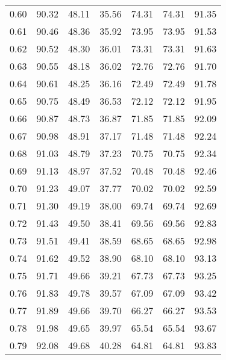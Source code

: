 \begin{tabular}{|c|c|c|c|c|c|c|}
      0.60 &     90.32 &     48.11 &      35.56 &   74.31 &      74.31 &         91.35 \\
      0.61 &     90.46 &     48.36 &      35.92 &   73.95 &      73.95 &         91.53 \\
      0.62 &     90.52 &     48.30 &      36.01 &   73.31 &      73.31 &         91.63 \\
      0.63 &     90.55 &     48.18 &      36.02 &   72.76 &      72.76 &         91.70 \\
      0.64 &     90.61 &     48.25 &      36.16 &   72.49 &      72.49 &         91.78 \\
      0.65 &     90.75 &     48.49 &      36.53 &   72.12 &      72.12 &         91.95 \\
      0.66 &     90.87 &     48.73 &      36.87 &   71.85 &      71.85 &         92.09 \\
      0.67 &     90.98 &     48.91 &      37.17 &   71.48 &      71.48 &         92.24 \\
      0.68 &     91.03 &     48.79 &      37.23 &   70.75 &      70.75 &         92.34 \\
      0.69 &     91.13 &     48.97 &      37.52 &   70.48 &      70.48 &         92.46 \\
      0.70 &     91.23 &     49.07 &      37.77 &   70.02 &      70.02 &         92.59 \\
      0.71 &     91.30 &     49.19 &      38.00 &   69.74 &      69.74 &         92.69 \\
      0.72 &     91.43 &     49.50 &      38.41 &   69.56 &      69.56 &         92.83 \\
      0.73 &     91.51 &     49.41 &      38.59 &   68.65 &      68.65 &         92.98 \\
      0.74 &     91.62 &     49.52 &      38.90 &   68.10 &      68.10 &         93.13 \\
      0.75 &     91.71 &     49.66 &      39.21 &   67.73 &      67.73 &         93.25 \\
      0.76 &     91.83 &     49.78 &      39.57 &   67.09 &      67.09 &         93.42 \\
      0.77 &     91.89 &     49.66 &      39.70 &   66.27 &      66.27 &         93.53 \\
      0.78 &     91.98 &     49.65 &      39.97 &   65.54 &      65.54 &         93.67 \\
      0.79 &     92.08 &     49.68 &      40.28 &   64.81 &      64.81 &         93.83 \\

\end{tabular}
